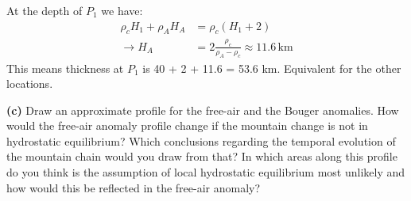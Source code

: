\ifanswers
  \begin{tcolorbox}[enhanced jigsaw,breakable,pad at break*=1mm,
    colback=blue!5!white,colframe=babyblueeyes,title=Solutions]
At the depth of $P_1$ we have:
\begin{align*}
\rho_c H_1 + \rho_A H_A &= \rho_c (H_1 + 2) \\
\rightarrow H_A &= 2 \frac{\rho_c}{\rho_A -\rho_c} \approx 11.6 \, \text{km}
\end{align*}
This means thickness at $P_1$ is 40 + 2 + 11.6 = 53.6 km. Equivalent for the other locations.
\end{tcolorbox}
\fi

\textbf{(c)} Draw an approximate profile for the free-air and the Bouger anomalies. How would the free-air anomaly profile change if the mountain change is not in hydrostatic equilibrium? Which conclusions regarding the temporal evolution of the mountain chain would you draw from that? In which areas along this profile do you think is the assumption of local hydrostatic equilibrium most unlikely and how would this be reflected in the free-air anomaly?
\ifanswers
